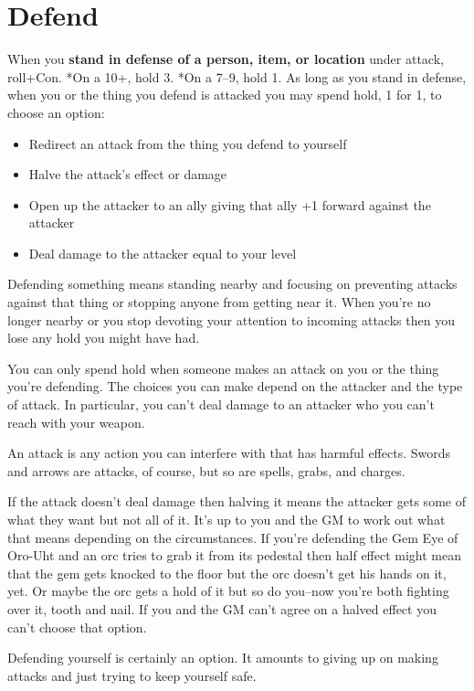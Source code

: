 \section*{Defend}
\HRule
 When you \textbf{stand in defense of a person, item, or location}
 under attack, roll+Con. *On a 10+, hold 3. *On a 7--9, hold 1. As long as you stand in defense, when you or the thing you defend is attacked you may spend hold, 1 for 1, to choose an option:
\begin{itemize}
\item Redirect an attack from the thing you defend to yourself
\item Halve the attack's effect or damage
\item Open up the attacker to an ally giving that ally +1 forward against the attacker
\item Deal damage to the attacker equal to your level
\end{itemize}
\HRule


 Defending something means standing nearby and focusing on preventing attacks against that thing or stopping anyone from getting near it. When you're no longer nearby or you stop devoting your attention to incoming attacks then you lose any hold you might have had.


 You can only spend hold when someone makes an attack on you or the thing you're defending. The choices you can make depend on the attacker and the type of attack. In particular, you can't deal damage to an attacker who you can't reach with your weapon.


 An attack is any action you can interfere with that has harmful effects. Swords and arrows are attacks, of course, but so are spells, grabs, and charges. 


 If the attack doesn't deal damage then halving it means the attacker gets some of what they want but not all of it. It's up to you and the GM to work out what that means depending on the circumstances. If you're defending the Gem Eye of Oro-Uht and an orc tries to grab it from its pedestal then half effect might mean that the gem gets knocked to the floor but the orc doesn't get his hands on it, yet. Or maybe the orc gets a hold of it but so do you--now you're both fighting over it, tooth and nail. If you and the GM can't agree on a halved effect you can't choose that option.


 Defending yourself is certainly an option. It amounts to giving up on making attacks and just trying to keep yourself safe.


